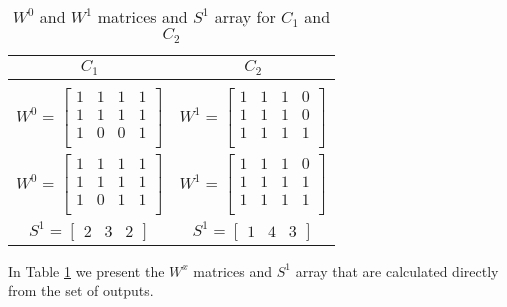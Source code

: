 \documentclass[../main.tex]{subfiles}
\begin{document}
	\begin{table}[H]
		\begin{center}
				\begin{tabular}{ c c }
				\textbf{$C_1$} & \textbf{$C_2$}\\
				\midrule\\
				\addlinespace[-2ex]
				$W^0 = \begin{bmatrix} 1 & 1 & 1 & 1 \\ 1 & 1 & 1 & 1 \\ 1 & 0 & 0 & 1 \\ \end{bmatrix}$
				\quad
				&
				$W^1 = \begin{bmatrix}1 & 1 & 1 & 0 \\1 & 1 & 1 & 0 \\1 & 1 & 1 & 1 \\ \end{bmatrix}$
				\quad \\
				\addlinespace[1.5ex]
				$W^0 = \begin{bmatrix} 1 & 1 & 1 & 1 \\ 1 & 1 & 1 & 1 \\ 1 & 0 & 1 & 1 \\ \end{bmatrix}$
				\quad
				& 
				$W^1 = \begin{bmatrix} 1 & 1 & 1 & 0 \\ 1 & 1 & 1 & 1 \\ 1 & 1 & 1 & 1 \\ \end{bmatrix}$
				\quad \\
				\addlinespace[1.5ex]
				\hspace*{-0.6cm}$S^1 = \begin{bmatrix} 2 & 3 & 2 \end{bmatrix}$
				\quad
				& 
				\hspace*{-0.6cm}$S^1 = \begin{bmatrix} 1 & 4 & 3 \end{bmatrix}$
				\quad \\
			\end{tabular}
		\end{center}	
	\caption{$W^0$ and $W^1$ matrices and $S^1$ array for $C_1$ and $C_2$ }
	\label{table:wMatricesExample}
	\end{table}

	In Table \ref{table:wMatricesExample} we present the $W^x$ matrices and $S^1$ array that are calculated directly from the set of outputs.
	
\end{document}
